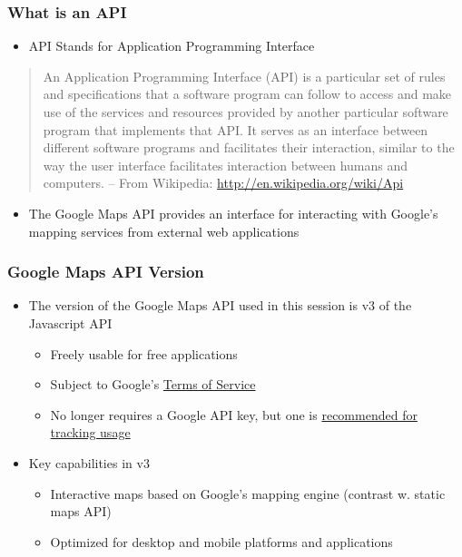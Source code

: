 \documentclass[]{article}
\begin{document}
\subsubsection{What is an API}\label{what-is-an-api}

\begin{itemize}
\itemsep1pt\parskip0pt
\item
  API Stands for Application Programming Interface
\end{itemize}

\begin{quote}
An Application Programming Interface (API) is a particular set of rules
and specifications that a software program can follow to access and make
use of the services and resources provided by another particular
software program that implements that API. It serves as an interface
between different software programs and facilitates their interaction,
similar to the way the user interface facilitates interaction between
humans and computers. -- From Wikipedia:
\url{http://en.wikipedia.org/wiki/Api}
\end{quote}

\begin{itemize}
\itemsep1pt\parskip0pt
\item
  The Google Maps API provides an interface for interacting with
  Google's mapping services from external web applications
\end{itemize}

\subsubsection{Google Maps API Version}\label{google-maps-api-version}

\begin{itemize}
\itemsep1pt\parskip0pt
\item
  The version of the Google Maps API used in this session is v3 of the
  Javascript API

  \begin{itemize}
  \itemsep1pt\parskip0pt
  \item
    Freely usable for free applications
  \item
    Subject to Google's
    \href{https://developers.google.com/maps/terms?hl=en}{Terms of
    Service}
  \item
    No longer requires a Google API key, but one is
    \href{http://tinyurl.com/d52lcm2}{recommended for tracking usage}
  \end{itemize}
\item
  Key capabilities in v3

  \begin{itemize}
  \itemsep1pt\parskip0pt
  \item
    Interactive maps based on Google's mapping engine (contrast w.
    static maps API)
  \item
    Optimized for desktop and mobile platforms and applications
  \end{itemize}
\end{itemize}
\end{document}
